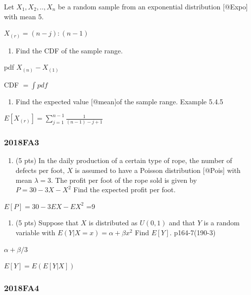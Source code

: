 \documentclass[6pt,Portrait]{article}
\providecommand{\tightlist}{%
  \setlength{\itemsep}{0pt}\setlength{\parskip}{0pt}}
\begin{document}
Let \(X_1,X_2,..,X_n\) be a random sample from an exponential
distribution {[}@Expo{]} with mean 5.

\(X_{(r)}=(n-j):(n-1)\)

\begin{enumerate}
\def\labelenumi{(\alph{enumi})}
\tightlist
\item
  Find the CDF of the sample range.
\end{enumerate}

pdf \(X_{(n)}-X_{(1)}\)

CDF \(=\int pdf\)

\begin{enumerate}
\def\labelenumi{(\alph{enumi})}
\setcounter{enumi}{1}
\tightlist
\item
  Find the expected value {[}@mean{]}of the sample range. Example 5.4.5
\end{enumerate}

\(E[X_{(r)}]=\sum_{j=1}^{n-1}\frac1{(n-1)-j+1}\)

\hypertarget{fa3-4}{%
\subsubsection{2018FA3}\label{fa3-4}}

\begin{enumerate}
\def\labelenumi{(\alph{enumi})}
\tightlist
\item
  (5 pts) In the daily production of a certain type of rope, the number
  of defects per foot, \(X\) is assumed to have a Poisson distribution
  {[}@Pois{]} with mean \(\lambda=3\). The profit per foot of the rope
  sold is given by \(P=30-3X-X^2\) Find the expected profit per foot.
\end{enumerate}

\(E[P]=30-3EX-EX^2\) =9

\begin{enumerate}
\def\labelenumi{(\alph{enumi})}
\setcounter{enumi}{1}
\tightlist
\item
  (5 pts) Suppose that \(X\) is distributed as \(U(0,1)\) and that \(Y\)
  is a random variable with \(E(Y|X=x)=\alpha+\beta x^2\) Find \(E[Y]\).
  p164-7(190-3)
\end{enumerate}

\(\alpha+\beta/3\)

\(E[Y]=E(E[Y|X])\)

\hypertarget{fa4-4}{%
\subsubsection{2018FA4}\label{fa4-4}}
\end{document}
